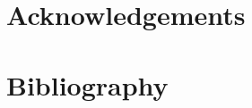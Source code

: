 \documentclass[preprint,11pt,authoryear]{elsarticle}
\begin{document}

\section{Acknowledgements}
\label{sec:acknowledgements}





\section{Bibliography}
\label{sec:bibliography}



\end{document}
